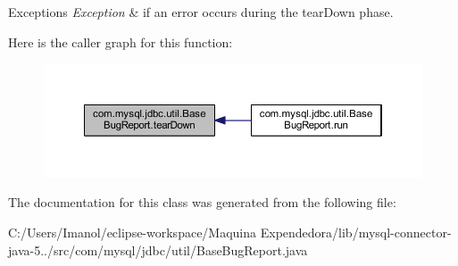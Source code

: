 \begin{DoxyExceptions}{Exceptions}
{\em Exception} & if an error occurs during the \textquotesingle{}tear\+Down\textquotesingle{} phase. \\
\hline
\end{DoxyExceptions}
Here is the caller graph for this function\+:
\nopagebreak
\begin{figure}[H]
\begin{center}
\leavevmode
\includegraphics[width=350pt]{classcom_1_1mysql_1_1jdbc_1_1util_1_1_base_bug_report_a7fd16c03e3e8778c75cb64274e1349de_icgraph}
\end{center}
\end{figure}


The documentation for this class was generated from the following file\+:\begin{DoxyCompactItemize}
\item 
C\+:/\+Users/\+Imanol/eclipse-\/workspace/\+Maquina Expendedora/lib/mysql-\/connector-\/java-\/5../src/com/mysql/jdbc/util/Base\+Bug\+Report.\+java\end{DoxyCompactItemize}
